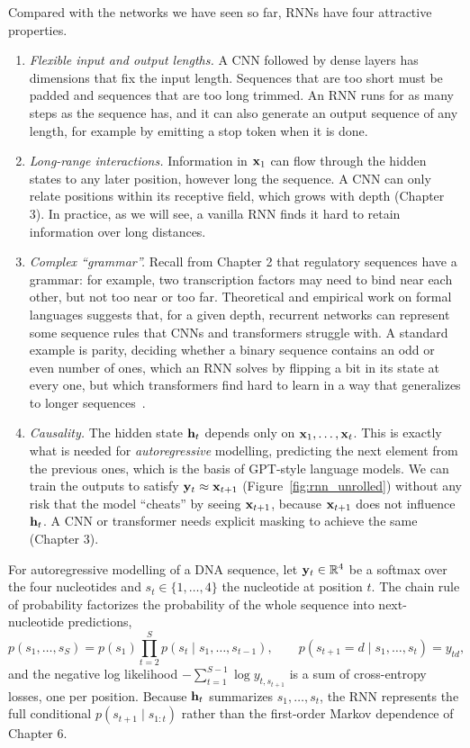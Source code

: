 Compared with the networks we have seen so far, RNNs have four attractive properties.
\begin{enumerate}
  \item \emph{Flexible input and output lengths.} A CNN followed by dense layers has dimensions that fix the input length. Sequences that are too short must be padded and sequences that are too long trimmed. An RNN runs for as many steps as the sequence has, and it can also generate an output sequence of any length, for example by emitting a stop token when it is done.
  \item \emph{Long-range interactions.} Information in $\mathbf{x}_1$ can flow through the hidden states to any later position, however long the sequence. A CNN can only relate positions within its receptive field, which grows with depth (Chapter 3). In practice, as we will see, a vanilla RNN finds it hard to retain information over long distances.
  \item \emph{Complex ``grammar''.} Recall from Chapter 2 that regulatory sequences have a grammar: for example, two transcription factors may need to bind near each other, but not too near or too far. Theoretical and empirical work on formal languages suggests that, for a given depth, recurrent networks can represent some sequence rules that CNNs and transformers struggle with. A standard example is parity, deciding whether a binary sequence contains an odd or even number of ones, which an RNN solves by flipping a bit in its state at every one, but which transformers find hard to learn in a way that generalizes to longer sequences~\citep{deletang2023}.
  \item \emph{Causality.} The hidden state $\mathbf{h}_t$ depends only on $\mathbf{x}_1,\dots,\mathbf{x}_t$. This is exactly what is needed for \emph{autoregressive} modelling, predicting the next element from the previous ones, which is the basis of GPT-style language models. We can train the outputs to satisfy $\mathbf{y}_t\approx\mathbf{x}_{t+1}$ (Figure~\ref{fig:rnn_unrolled}) without any risk that the model ``cheats'' by seeing $\mathbf{x}_{t+1}$, because $\mathbf{x}_{t+1}$ does not influence $\mathbf{h}_t$. A CNN or transformer needs explicit masking to achieve the same (Chapter 3).
\end{enumerate}

For autoregressive modelling of a DNA sequence, let $\mathbf{y}_t\in\mathbb{R}^4$ be a softmax over the four nucleotides and $s_{t}\in\{1,\dots,4\}$ the nucleotide at position $t$. The chain rule of probability factorizes the probability of the whole sequence into next-nucleotide predictions,
\begin{equation}
  p(s_1,\dots,s_S) = p(s_1)\prod_{t=2}^{S}p(s_t\mid s_1,\dots,s_{t-1}),
  \qquad p(s_{t+1}=d\mid s_1,\dots,s_t) = y_{td},
\end{equation}
and the negative log likelihood $-\sum_{t=1}^{S-1}\log y_{t,s_{t+1}}$ is a sum of cross-entropy losses, one per position. Because $\mathbf{h}_t$ summarizes $s_1,\dots,s_t$, the RNN represents the full conditional $p(s_{t+1}\mid s_{1:t})$ rather than the first-order Markov dependence of Chapter 6.

